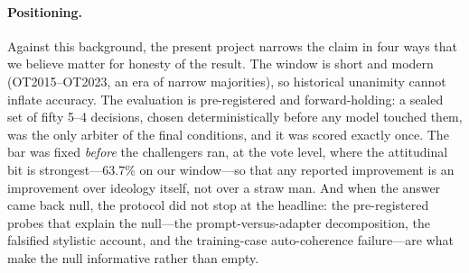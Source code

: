 \paragraph{Positioning.}
Against this background, the present project narrows the claim in
four ways that we believe matter for honesty of the result. The
window is short and modern (OT2015--OT2023, an era of narrow
majorities), so historical unanimity cannot inflate accuracy. The
evaluation is pre-registered and forward-holding: a sealed set of
fifty 5--4 decisions, chosen deterministically before any model
touched them, was the only arbiter of the final conditions, and it
was scored exactly once. The bar was fixed \emph{before} the
challengers ran, at the vote level, where the attitudinal bit is
strongest---63.7\% on our window---so that any reported improvement
is an improvement over ideology itself, not over a straw man. And
when the answer came back null, the protocol did not stop at the
headline: the pre-registered probes that explain the null---the
prompt-versus-adapter decomposition, the falsified stylistic
account, and the training-case auto-coherence failure---are what
make the null informative rather than empty.
